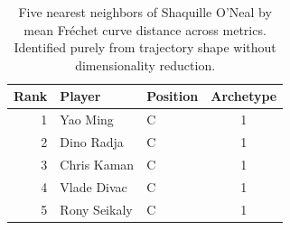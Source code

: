 \begin{table}[htbp]
  \centering\small
  \begin{tabular}{rllc}
    \toprule
    Rank & Player & Position & Archetype \\
    \midrule
    1 & Yao Ming & C & 1 \\
    2 & Dino Radja & C & 1 \\
    3 & Chris Kaman & C & 1 \\
    4 & Vlade Divac & C & 1 \\
    5 & Rony Seikaly & C & 1 \\
    \bottomrule
  \end{tabular}
  \caption{Five nearest neighbors of Shaquille O'Neal by mean Fr\'{e}chet curve distance across metrics. Identified purely from trajectory shape without dimensionality reduction.}
  \label{tab:Shaquille_O_Neal_frechet_curve_neighbors}
\end{table}


